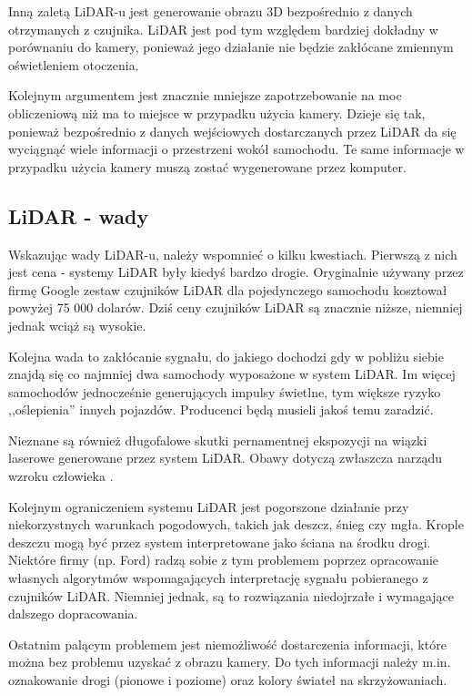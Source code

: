 Inną zaletą LiDAR-u jest generowanie obrazu 3D bezpośrednio z danych otrzymanych z czujnika. LiDAR jest pod tym względem bardziej dokładny w porównaniu do kamery, ponieważ jego działanie nie będzie zakłócane zmiennym oświetleniem otoczenia.

Kolejnym argumentem jest znacznie mniejsze zapotrzebowanie na moc obliczeniową niż ma to miejsce w przypadku użycia kamery. Dzieje się tak, ponieważ bezpośrednio z danych wejściowych dostarczanych przez LiDAR da się wyciągnąć wiele informacji o przestrzeni wokół samochodu. Te same informacje w przypadku użycia kamery muszą zostać wygenerowane przez komputer.

\subsection{LiDAR - wady}
Wskazując wady LiDAR-u, należy wspomnieć o kilku kwestiach. Pierwszą z nich jest cena - systemy LiDAR były kiedyś bardzo drogie. Oryginalnie używany przez firmę Google zestaw czujników LiDAR dla pojedynczego samochodu kosztował powyżej 75 000 dolarów. Dziś ceny czujników LiDAR są znacznie niższe, niemniej jednak wciąż są wysokie.

Kolejna wada to zakłócanie sygnału, do jakiego dochodzi gdy w pobliżu siebie znajdą się co najmniej dwa samochody wyposażone w system LiDAR. Im więcej samochodów jednocześnie generujących impulsy świetlne, tym większe ryzyko ,,oślepienia'' innych pojazdów. Producenci będą musieli jakoś temu zaradzić.

Nieznane są również długofalowe skutki pernamentnej ekspozycji na wiązki laserowe generowane przez system LiDAR. Obawy dotyczą zwłaszcza narządu wzroku człowieka \cite{armenta:lidarSafety, thomasAko:lidarSafety, hecht:lidarSafety}.

Kolejnym ograniczeniem systemu LiDAR jest pogorszone działanie przy niekorzystnych warunkach pogodowych, takich jak deszcz, śnieg czy mgła. Krople deszczu mogą być przez system interpretowane jako ściana na środku drogi. Niektóre firmy (np. Ford) radzą sobie z tym problemem poprzez opracowanie własnych algorytmów wspomagających interpretację sygnału pobieranego z czujników LiDAR. Niemniej jednak, są to rozwiązania niedojrzałe i wymagające dalszego dopracowania.

Ostatnim palącym problemem jest niemożliwość dostarczenia informacji, które można bez problemu uzyskać z obrazu kamery. Do tych informacji należy m.in. oznakowanie drogi (pionowe i poziome) oraz kolory świateł na skrzyżowaniach.

